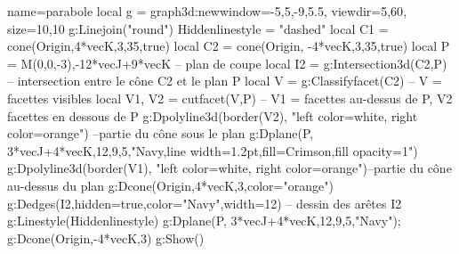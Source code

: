 \begin{luadraw}{name=parabole}
local g = graph3d:new{window={-5,5,-9,5.5}, viewdir={5,60}, size={10,10}}
g:Linejoin("round")
Hiddenlinestyle = "dashed"
local C1 = cone(Origin,4*vecK,3,35,true)
local C2 = cone(Origin, -4*vecK,3,35,true)
local P = {M(0,0,-3),-12*vecJ+9*vecK} -- plan de coupe
local I2 = g:Intersection3d(C2,P) -- intersection entre le cône C2 et le plan P
local V = g:Classifyfacet(C2) -- V = facettes visibles
local V1, V2 = cutfacet(V,P) -- V1 = facettes au-dessus de P, V2 facettes en dessous de P
g:Dpolyline3d(border(V2), "left color=white, right color=orange") --partie du cône sous le plan
g:Dplane(P, 3*vecJ+4*vecK,12,9,5,"Navy,line width=1.2pt,fill=Crimson,fill opacity=1")
g:Dpolyline3d(border(V1), "left color=white, right color=orange")--partie du cône au-dessus du plan
g:Dcone(Origin,4*vecK,3,{color="orange"})
g:Dedges(I2,{hidden=true,color="Navy",width=12}) -- dessin des arêtes I2
g:Linestyle(Hiddenlinestyle)
g:Dplane(P, 3*vecJ+4*vecK,12,9,5,"Navy"); g:Dcone(Origin,-4*vecK,3)
g:Show()
\end{luadraw}
